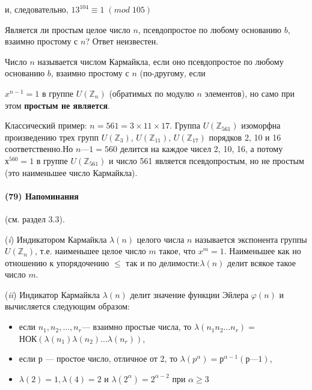   	
  	и, следовательно, $13^{104} \equiv 1\;(mod\;105)$
  	
  	\noindent
  	
	Является ли простым целое число $n$, псевдопростое по любому основанию $b$, взаимно простому с $n$? Ответ неизвестен.

  	

  	
	\begin{determ}
  	
	\noindent
  	

  	
	Число $n$ называется числом Кармайкла, если оно псевдопростое
	по любому основанию $b$, взаимно простому с $n$ (по-другому, если
  	

  	
	\pagebreak
  	
  	 \noindent
  	 $x^{n-1} = 1$ в группе $U(\mathbb Z_n)$ (обратимых по модулю $n$ элементов), но само при этом {\bf простым не является}. 
  	\end{determ}
  	Классический пример: $n = 561 = 3 \times 11 \times 17$. Группа $U(\mathbb Z_{561})$ изоморфна произведению трех групп $U(\mathbb Z_3)$, $U(\mathbb Z_{11})$, $U(\mathbb Z_{17})$ порядков 2, 10	и 16 соответственно.Но $n — 1 = 560$ делится на каждое чисел 2, 10, 16, а потому $х^{560} = 1$ в группе $U(\mathbb Z_{561})$ и число 561 является псевдопростым,	но не простым (это наименьшее число Кармайкла).

  	
  	\paragraph{(79) Напоминания} (см. раздел 3.3).
  	\noindent
  	
  	({\it i}) Индикатором Кармайкла $\lambda(n)$ целого числа $n$ называется экспонента группы $U(\mathbb Z_{n})$, т.е. наименьшее целое число $m$ такое, что $x^m = 1$.	Наименьшее как но отношению к упорядочению $\leqslant$ так и по делимости:$\lambda(n)$ делит всякое такое число $m$.
  	
  	({\it ii}) Индикатор Кармайкла $\lambda(n)$ делит значение функции Эйлера 	$\varphi(n)$ и вычисляется следующим образом:
  	\begin{itemize}
  		\item если $n_1,n_2,...,n_r$— взаимно простые числа, то $\lambda(n_1n_2...n_r)=$ \\ НОК$(\lambda(n_1)\lambda(n_2)...\lambda(n_r))$,
  		\item если $р$ — простое число, отличное от 2, то $\lambda(p^{\alpha}) = р^{\alpha-1}(р — 1)$,
  		\item $\lambda(2)=1,\lambda(4)=2$ и $\lambda(2^{\alpha})=2^{\alpha-2}$ при $\alpha \geqslant 3$
  	\end{itemize}
  
